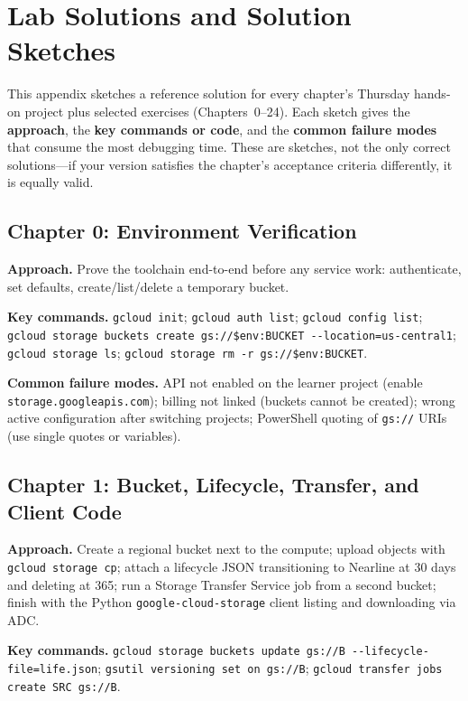 \chapter{Lab Solutions and Solution Sketches}
%
This appendix sketches a reference solution for every chapter's Thursday hands-on project plus
selected exercises (Chapters~0--24). Each sketch gives the \textbf{approach}, the \textbf{key
commands or code}, and the \textbf{common failure modes} that consume the most debugging time.
These are sketches, not the only correct solutions---if your version satisfies the chapter's
acceptance criteria differently, it is equally valid.

\section{Chapter 0: Environment Verification}
\textbf{Approach.} Prove the toolchain end-to-end before any service work: authenticate, set
defaults, create/list/delete a temporary bucket.

\textbf{Key commands.} \texttt{gcloud init}; \texttt{gcloud auth list}; \texttt{gcloud config
list}; \texttt{gcloud storage buckets create gs://\$env:BUCKET -{}-location=us-central1};
\texttt{gcloud storage ls}; \texttt{gcloud storage rm -r gs://\$env:BUCKET}.

\textbf{Common failure modes.} API not enabled on the learner project (enable
\texttt{storage.googleapis.com}); billing not linked (buckets cannot be created); wrong active
configuration after switching projects; PowerShell quoting of \texttt{gs://} URIs (use single
quotes or variables).

\section{Chapter 1: Bucket, Lifecycle, Transfer, and Client Code}
\textbf{Approach.} Create a regional bucket next to the compute; upload objects with
\texttt{gcloud storage cp}; attach a lifecycle JSON transitioning to Nearline at 30 days and
deleting at 365; run a Storage Transfer Service job from a second bucket; finish with the Python
\texttt{google-cloud-storage} client listing and downloading via ADC.

\textbf{Key commands.} \texttt{gcloud storage buckets update gs://B -{}-lifecycle-file=life.json};
\texttt{gsutil versioning set on gs://B}; \texttt{gcloud transfer jobs create SRC gs://B}.

